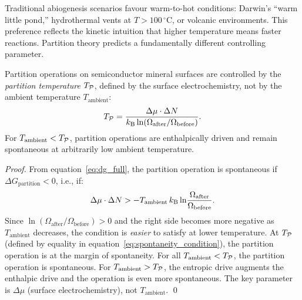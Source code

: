 Traditional abiogenesis scenarios favour warm-to-hot conditions: Darwin's ``warm
little pond,'' hydrothermal vents at $T > 100\,^\circ\mathrm{C}$, or volcanic
environments. This preference reflects the kinetic intuition that higher temperature
means faster reactions. Partition theory predicts a fundamentally different
controlling parameter.

\begin{proposition}
\label{prop:partition_temperature}
Partition operations on semiconductor mineral surfaces are controlled by the
\emph{partition temperature} $T_{\mathcal{P}}$, defined by the surface electrochemistry,
not by the ambient temperature $T_{\mathrm{ambient}}$:
\begin{equation}
  T_{\mathcal{P}} = \frac{\Delta\mu \cdot \Delta N}{k_{\mathrm{B}} \ln(\Omega_{\mathrm{after}} / \Omega_{\mathrm{before}})}.
  \label{eq:partition_temperature}
\end{equation}
For $T_{\mathrm{ambient}} < T_{\mathcal{P}}$, partition operations are enthalpically
driven and remain spontaneous at arbitrarily low ambient temperature.
\end{proposition}

\begin{proof}
From equation~\eqref{eq:dg_full}, the partition operation is spontaneous if
$\Delta G_{\mathrm{partition}} < 0$, i.e., if:
\begin{equation}
  \Delta\mu \cdot \Delta N > -T_{\mathrm{ambient}}\,k_{\mathrm{B}} \ln\!\frac{\Omega_{\mathrm{after}}}{\Omega_{\mathrm{before}}}.
  \label{eq:spontaneity_condition}
\end{equation}
Since $\ln(\Omega_{\mathrm{after}}/\Omega_{\mathrm{before}}) > 0$ and the right
side becomes more negative as $T_{\mathrm{ambient}}$ decreases, the condition
is \emph{easier} to satisfy at lower temperature. At $T_{\mathcal{P}}$ (defined by
equality in equation~\eqref{eq:spontaneity_condition}), the partition operation
is at the margin of spontaneity. For all $T_{\mathrm{ambient}} < T_{\mathcal{P}}$, the
partition operation is spontaneous. For $T_{\mathrm{ambient}} > T_{\mathcal{P}}$, the
entropic drive augments the enthalpic drive and the operation is even more
spontaneous. The key parameter is $\Delta\mu$ (surface electrochemistry), not $T_{\mathrm{ambient}}$.
\qed
\end{proof}

